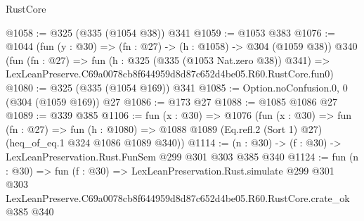 \begin{lexlean}{RustCore}
\begin{coremodule}
@1058 := @325 (@335 (@1054 @38)) @341
@1059 := @1053 @383
@1076 := @1044
    (fun (y : @30) => (fn : @27) -> (h : @1058) -> @304 (@1059 @38))
    @340
    (fun (fn : @27) =>
    fun (h : @325 (@335 (@1053 Nat.zero @38)) @341) =>
    LexLeanPreserve.C69a0078cb8f644959d8d87c652d4be05.R60.RustCore.fun0)
@1080 := @325 (@335 (@1054 @169)) @341
@1085 := Option.noConfusion.{0, 0} (@304 (@1059 @169)) @27
@1086 := @173 @27
@1088 := @1085 @1086 @27
@1089 := @339 @385
@1106 := fun (x : @30) =>
  @1076
    (fun (x : @30) =>
    fun (fn : @27) =>
    fun (h : @1080) => @1088 @1089 (Eq.refl.{2} (Sort 1) @27) (heq_of_eq.{1} @324 @1086 @1089 @340))
@1114 := (n : @30) -> (f : @30) -> LexLeanPreservation.Rust.FunSem @299 @301 @303 @385 @340
@1124 := fun (n : @30) =>
  fun (f : @30) =>
  LexLeanPreservation.Rust.simulate
    @299
    @301
    @303
    LexLeanPreserve.C69a0078cb8f644959d8d87c652d4be05.R60.RustCore.crate_ok
    @385
    @340
\end{coremodule}
\end{lexlean}
